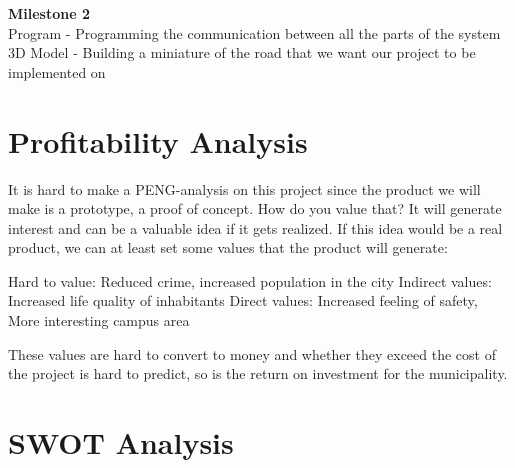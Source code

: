 \documentclass[twoside]{report}
\begin{document}
\textbf{Milestone 2}\\
Program - Programming the communication between all the parts of the system\\
3D Model - Building a miniature of the road that we want our project to be
implemented on

\section{Profitability Analysis}


It is hard to make a PENG-analysis on this project since the product we will
make is a prototype, a proof of concept. How do you value that? It will generate
interest and can be a valuable idea if it gets realized. If this idea would be a
real product, we can at least set some values that the product will generate: 


Hard to value: Reduced crime, increased population in the city Indirect values:
Increased life quality of inhabitants Direct values: Increased feeling of
safety, More interesting campus area

These values are hard to convert to money and whether they exceed the cost of
the project is hard to predict, so is the return on investment for the
municipality.

\newpage
\section{SWOT Analysis}
\end{document}
